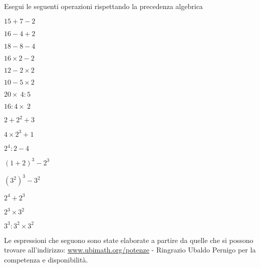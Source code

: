 \begin{esercizio}
Esegui le seguenti operazioni rispettando la precedenza algebrica
 \begin{htmulticols}{4}
 \begin{enumeratees}
 \item \(15+7-2\)
 \item \(16-4+2\)
 \item \(18-8-4\)
 \item \(16\times 2-2\)
 \item \(12-2\times 2\)
 \item \(10-5\times 2\)
 \item \(20\times~4:5\)
 \item \(16:4\times~2\)
 \item \(2+2^2+3\)
 \item \(4\times 2^3+1\)
 \item \(2^4:2-4\)
 \item \((1+2)^3-2^3\)
 \item \((3^2)^3-3^2\)
 \item \(2^4+2^3\)
 \item \(2^3\times3^2\)
 \item \(3^3:3^2\times3^2\)
 \end{enumeratees}
 \end{htmulticols}
\end{esercizio}


Le espressioni che seguono sono state elaborate a partire da quelle che si 
possono trovare all'indirizzo:
\href{http://www.ubimath.org/potenze}{www.ubimath.org/potenze} - 
Ringrazio Ubaldo Pernigo per la competenza e disponibilità.


